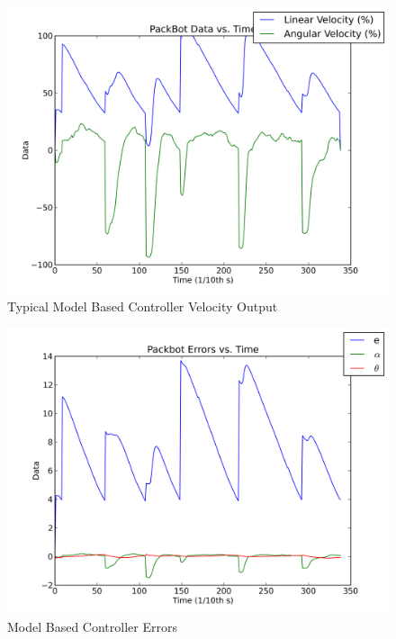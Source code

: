 \begin{figure}[ht!]
	\centering
	\includegraphics[width=.5\textwidth]{images/pbtx/20110113_1451_pbtx_simpleDrive}
	\caption{Typical Model Based Controller Velocity Output}
	\label{fig:mbOutput}
\end{figure}

\begin{figure}[ht!]
	\centering
	\includegraphics[width=.5\textwidth]{images/pbtx/20110113_1451_pbtx_simpleDriveErrors}
	\caption{Model Based Controller Errors}
	\label{fig:mbErrors}
\end{figure}

